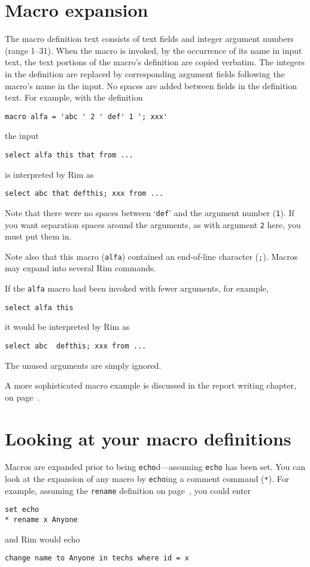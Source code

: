 \documentclass[11pt,a4paper]{report}
\begin{document}
\section{Macro expansion}
The macro definition text consists of text fields
and integer argument numbers (range 1--31).
When the macro is invoked,
by the occurrence of its name in input text, the text portions
of the macro's definition are copied verbatim.  The integers
in the definition are replaced by corresponding argument
fields following the macro's name in the input.
No spaces are added between fields in the definition text.
For example, with the definition
\begin{verbatim}
macro alfa = 'abc ' 2 ' def' 1 '; xxx'
\end{verbatim}
the input
\begin{verbatim}
select alfa this that from ...
\end{verbatim}
is interpreted by Rim as
\begin{verbatim}
select abc that defthis; xxx from ...
\end{verbatim}

Note that there were no spaces between `\verb!def!' and the argument number (\verb!1!).
If you want separation spaces around the arguments, as with argument
\verb!2! here, you must put them in.
 
Note also that this macro (\verb!alfa!) contained an end-of-line character
(\verb!;!).  Macros may expand into several Rim commands.
 
If the \verb!alfa! macro had been invoked with fewer arguments, for example,
\begin{verbatim}
select alfa this
\end{verbatim}
it would be interpreted by Rim as
\begin{verbatim}
select abc  defthis; xxx from ...
\end{verbatim}
The unused arguments are simply ignored.
 
A more sophisticated macro example is discussed
in the report writing chapter, on page~\pageref{run-mac}.
 
\section{Looking at your macro definitions}
\label{show-mac}
Macros are expanded prior to being \verb!echo!d---assuming \verb!echo!
has been set.
You can look at the expansion of any macro by \verb!echo!ing a
comment command (\verb!*!).  For example, assuming the \verb!rename! 
definition on page~\pageref{rename-def}, you could enter
\begin{verbatim}
set echo
* rename x Anyone
\end{verbatim}
and Rim would echo
\begin{verbatim}
change name to Anyone in techs where id = x
\end{verbatim}
   
\end{document}
